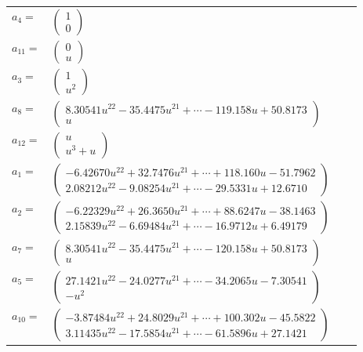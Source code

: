 \documentclass[1p]{elsarticle_modified}
\theoremstyle{definition}
\begin{document}
\begin{tabular}{m{7pt} m{180pt} m{7pt} m{180pt} }
\flushright $a_{4}=$&$\begin{pmatrix}1\\0\end{pmatrix}$ \\
\flushright $a_{11}=$&$\begin{pmatrix}0\\u\end{pmatrix}$ \\
\flushright $a_{3}=$&$\begin{pmatrix}1\\u^2\end{pmatrix}$ \\
\flushright $a_{8}=$&$\begin{pmatrix}8.30541 u^{22}-35.4475 u^{21}+\cdots-119.158 u+50.8173\\u\end{pmatrix}$ \\
\flushright $a_{12}=$&$\begin{pmatrix}u\\u^3+u\end{pmatrix}$ \\
\flushright $a_{1}=$&$\begin{pmatrix}-6.42670 u^{22}+32.7476 u^{21}+\cdots+118.160 u-51.7962\\2.08212 u^{22}-9.08254 u^{21}+\cdots-29.5331 u+12.6710\end{pmatrix}$ \\
\flushright $a_{2}=$&$\begin{pmatrix}-6.22329 u^{22}+26.3650 u^{21}+\cdots+88.6247 u-38.1463\\2.15839 u^{22}-6.69484 u^{21}+\cdots-16.9712 u+6.49179\end{pmatrix}$ \\
\flushright $a_{7}=$&$\begin{pmatrix}8.30541 u^{22}-35.4475 u^{21}+\cdots-120.158 u+50.8173\\u\end{pmatrix}$ \\
\flushright $a_{5}=$&$\begin{pmatrix}27.1421 u^{22}-24.0277 u^{21}+\cdots-34.2065 u-7.30541\\- u^2\end{pmatrix}$ \\
\flushright $a_{10}=$&$\begin{pmatrix}-3.87484 u^{22}+24.8029 u^{21}+\cdots+100.302 u-45.5822\\3.11435 u^{22}-17.5854 u^{21}+\cdots-61.5896 u+27.1421\end{pmatrix}$ \\

\end{tabular}
\end{document}
